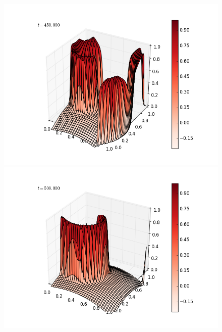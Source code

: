 \documentclass[12pt]{article}
\begin{document}
\begin{figure}[H]
\includegraphics[scale=0.4]{partc_fast_frames/partc_fast_fig21.png}
\includegraphics[scale=0.4]{partc_fast_frames/partc_fast_fig23.png}
\end{figure}
\end{document}
